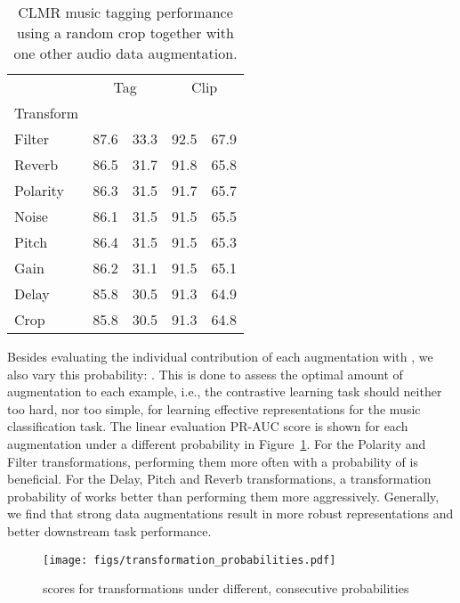 \documentclass{article}
\begin{document}
\begin{table}[t]
\centering
    \footnotesize
    \begin{tabular}{lcccc}
    \toprule
    &\multicolumn{2}{c}{Tag} &\multicolumn{2}{c}{Clip}\\
    \cmidrule(lr){2-3} \cmidrule(lr){4-5}
    Transform &  &  &  &   \\
    \midrule
    Filter & 87.6 & 33.3 & 92.5 & 67.9 \\
    Reverb & 86.5 & 31.7 & 91.8 & 65.8 \\
    Polarity & 86.3 & 31.5 & 91.7 & 65.7 \\
    Noise & 86.1 & 31.5 & 91.5 & 65.5 \\
    Pitch & 86.4 & 31.5 & 91.5 & 65.3 \\
    Gain & 86.2 & 31.1 & 91.5 & 65.1 \\
    Delay & 85.8 & 30.5	& 91.3 & 64.9 \\
    Crop & 85.8 & 30.5 & 91.3 & 64.8  \\
    \bottomrule
    \end{tabular}
    \caption{CLMR music tagging performance using a random crop together with one other audio data augmentation.}
    \label{tab:transformation_study}
\end{table}

Besides evaluating the individual contribution of each augmentation with , we also vary this probability: .
This is done to assess the optimal amount of augmentation to each example, i.e., the contrastive learning task should neither too hard, nor too simple, for learning effective representations for the music classification task.
The linear evaluation PR-AUC score is shown for each augmentation under a different probability  in Figure~\ref{fig:transformation_probabilities}.
For the Polarity and Filter transformations, performing them more often with a probability of  is beneficial.
For the Delay, Pitch and Reverb transformations, a transformation probability of  works better than performing them more aggressively.
Generally, we find that strong data augmentations result in more robust representations and better downstream task performance.

\begin{figure}[t]
    \centering
    \texttt{[image: figs/transformation\_probabilities.pdf]}
    \caption{ scores for transformations under different, consecutive probabilities }
    \label{fig:transformation_probabilities}
\end{figure}
\end{document}
